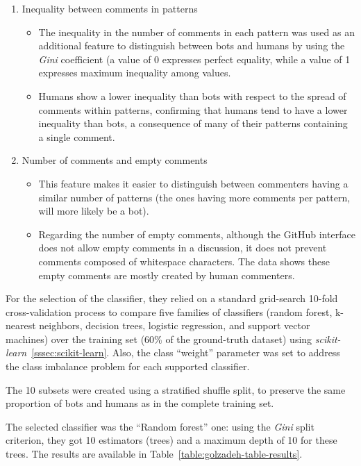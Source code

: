 \documentclass[a4paper, 12pt]{book}
\begin{document}
\begin{enumerate}
\begin{itemize}
        \end{itemize}
    \item Inequality between comments in patterns
        \begin{itemize}
            \item The inequality in the number of comments in each pattern was used as an additional feature to distinguish between bots and humans by using the \textit{Gini} coefficient (a value of 0 expresses perfect equality, while a value of 1 expresses maximum inequality among values.
            \item Humans show a lower inequality than bots with respect to the spread of comments within patterns, confirming that humans tend to have a lower inequality than bots, a consequence of many of their patterns containing a single comment.
        \end{itemize}
    \item Number of comments and empty comments
        \begin{itemize}
            \item This feature makes it easier to distinguish between commenters having a similar number of patterns (the ones having more comments per pattern, will more likely be a bot). 
            \item Regarding the number of empty comments, although the GitHub interface does not allow empty comments in a discussion, it does not prevent comments composed of whitespace characters. The data shows these empty comments are mostly created by human commenters.
        \end{itemize}
\end{enumerate}

For the selection of the classifier, they relied on a standard grid-search 10-fold cross-validation process to compare five families of classifiers (random forest, k-nearest neighbors, decision trees, logistic regression, and support vector machines) over the training set (60\% of the ground-truth dataset) using \textit{scikit-learn}~\ref{sssec:scikit-learn}. Also, the class ``weight'' parameter was set to address the class imbalance problem for each supported classifier.

The 10 subsets were created using a stratified shuffle split, to preserve the same proportion of bots and humans as in the complete training set.

The selected classifier was the ``Random forest'' one: using the \textit{Gini} split criterion, they got 10 estimators (trees) and a maximum depth of 10 for these trees. The results are available in Table~\ref{table:golzadeh-table-results}.
\smallskip
\end{document}
